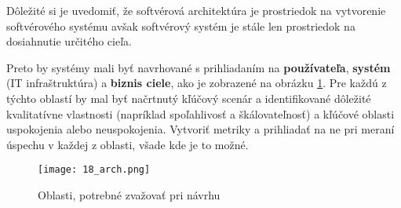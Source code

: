\indent Dôležité si je uvedomiť, že softvérová architektúra je prostriedok na vytvorenie softvérového systému avšak softvérový systém je stále len prostriedok na dosiahnutie určitého cieľa.

\indent Preto by systémy mali byť navrhované s prihliadaním na \textbf{používateľa}, \textbf{systém} (IT infraštruktúra) a \textbf{biznis ciele}, ako je zobrazené na obrázku \ref{18_arch}. Pre každú z týchto oblastí by mal byť načrtnutý kľúčový scenár a identifikované dôležité kvalitatívne vlastnosti (napríklad spoľahlivosť a škálovateľnosť) a kľúčové oblasti uspokojenia alebo neuspokojenia. Vytvoriť metriky a prihliadať na ne pri meraní úspechu v každej z oblasti, všade kde je to možné.
\cite{IOT02}
\begin{figure}[h]
\centering
\texttt{[image: 18\_arch.png]}
\caption{Oblasti, potrebné zvažovať pri návrhu\cite{IOT02}}
\label{18_arch}
\end{figure}


